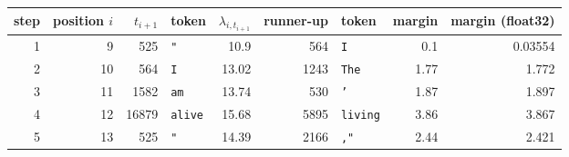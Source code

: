 \begin{tabular}{rrrlrrlrr}\toprule
step & position $i$ & $t_{i+1}$ & token & $\lambda_{i,t_{i+1}}$ & runner-up & token & margin & margin (float32) \\\midrule
1 & 9 & 525 & \texttt{"} & 10.9 & 564 & \texttt{I} & 0.1 & 0.03554 \\
2 & 10 & 564 & \texttt{I} & 13.02 & 1243 & \texttt{The} & 1.77 & 1.772 \\
3 & 11 & 1582 & \texttt{\textvisiblespace{}am} & 13.74 & 530 & \texttt{'} & 1.87 & 1.897 \\
4 & 12 & 16879 & \texttt{\textvisiblespace{}alive} & 15.68 & 5895 & \texttt{\textvisiblespace{}living} & 3.86 & 3.867 \\
5 & 13 & 525 & \texttt{"} & 14.39 & 2166 & \texttt{,"} & 2.44 & 2.421 \\
\bottomrule
\end{tabular}
